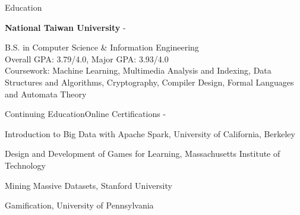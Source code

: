 \documentclass{cv}
\begin{document}
\begin{cvHeader} 
\end{cvHeader}


\begin{cvSection}{Education}

{\bf National Taiwan University}\iffalse, Taipei, Taiwan\fi \hfill {} - 

B.S. in Computer Science \& Information Engineering\\
Overall GPA: 3.79/4.0, Major GPA: 3.93/4.0\\
Coursework: Machine Learning, Multimedia Analysis and Indexing, Data Structures and Algorithms, Cryptography, Compiler Design, Formal Languages and Automata Theory


\begin{eduSubsection}{Continuing Education}{Online Certifications}{ - }

\item Introduction to Big Data with Apache Spark, University of California, Berkeley %
\item Design and Development of Games for Learning, Massachusetts Institute of Technology %
\item * Mining Massive Datasets, Stanford University %
\item Gamification, University of Pennsylvania %

\end{eduSubsection}

\end{cvSection}

\end{document}

